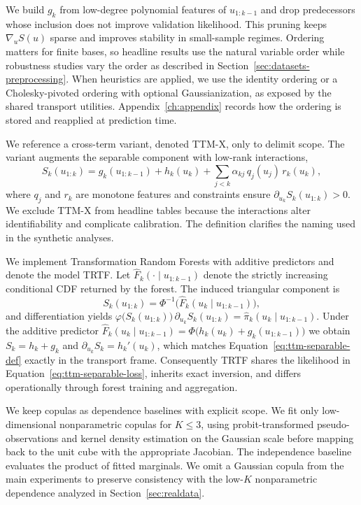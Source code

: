 \documentclass[11pt,a4paper,twoside]{book}\usepackage[]{graphicx}\usepackage[]{xcolor}
\begin{document}
We build $g_k$ from low-degree polynomial features of $u_{1:k-1}$ and drop predecessors whose inclusion does not improve validation likelihood. This pruning keeps $\nabla_u S(u)$ sparse and improves stability in small-sample regimes. Ordering matters for finite bases, so headline results use the natural variable order while robustness studies vary the order as described in Section~\ref{sec:datasets-preprocessing}. When heuristics are applied, we use the identity ordering or a Cholesky-pivoted ordering with optional Gaussianization, as exposed by the shared transport utilities. Appendix~\ref{ch:appendix} records how the ordering is stored and reapplied at prediction time.

We reference a cross-term variant, denoted TTM-X, only to delimit scope. The variant augments the separable component with low-rank interactions,
\begin{equation}
  S_k(u_{1:k}) = g_k(u_{1:k-1}) + h_k(u_k) + \sum_{j<k} \alpha_{kj}\,q_j(u_j)\,r_k(u_k),
  \label{eq:ttm-cross}
\end{equation}
where $q_j$ and $r_k$ are monotone features and constraints ensure $\partial_{u_k} S_k(u_{1:k}) > 0$. We exclude TTM-X from headline tables because the interactions alter identifiability and complicate calibration. The definition clarifies the naming used in the synthetic analyses.

We implement Transformation Random Forests with additive predictors and denote the model TRTF. Let $\widehat{F}_k(\cdot \mid u_{1:k-1})$ denote the strictly increasing conditional CDF returned by the forest. The induced triangular component is
\begin{equation}
  S_k(u_{1:k}) = \Phi^{-1}\!\big(\widehat{F}_k(u_k \mid u_{1:k-1})\big),
  \label{eq:trtf-transport}
\end{equation}
and differentiation yields $\varphi\big(S_k(u_{1:k})\big)\,\partial_{u_k} S_k(u_{1:k}) = \widehat{\pi}_k(u_k \mid u_{1:k-1})$. Under the additive predictor $\widehat{F}_k(u_k \mid u_{1:k-1}) = \Phi\big(h_k(u_k) + g_k(u_{1:k-1})\big)$ we obtain $S_k = h_k + g_k$ and $\partial_{u_k} S_k = h_k'(u_k)$, which matches Equation~\eqref{eq:ttm-separable-def} exactly in the transport frame. Consequently TRTF shares the likelihood in Equation~\eqref{eq:ttm-separable-loss}, inherits exact inversion, and differs operationally through forest training and aggregation.

We keep copulas as dependence baselines with explicit scope. We fit only low-dimensional nonparametric copulas for $K \le 3$, using probit-transformed pseudo-observations and kernel density estimation on the Gaussian scale before mapping back to the unit cube with the appropriate Jacobian. The independence baseline evaluates the product of fitted marginals. We omit a Gaussian copula from the main experiments to preserve consistency with the low-$K$ nonparametric dependence analyzed in Section~\ref{sec:realdata}.
\end{document}
